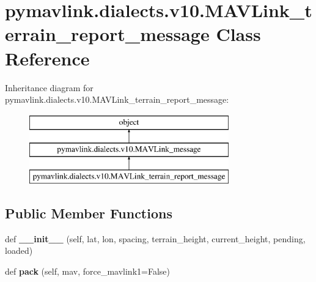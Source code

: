 \hypertarget{classpymavlink_1_1dialects_1_1v10_1_1MAVLink__terrain__report__message}{}\section{pymavlink.\+dialects.\+v10.\+M\+A\+V\+Link\+\_\+terrain\+\_\+report\+\_\+message Class Reference}
\label{classpymavlink_1_1dialects_1_1v10_1_1MAVLink__terrain__report__message}
Inheritance diagram for pymavlink.\+dialects.\+v10.\+M\+A\+V\+Link\+\_\+terrain\+\_\+report\+\_\+message\+:\begin{figure}[H]
\begin{center}
\leavevmode
\includegraphics[height=3.000000cm]{classpymavlink_1_1dialects_1_1v10_1_1MAVLink__terrain__report__message}
\end{center}
\end{figure}
\subsection*{Public Member Functions}
\begin{DoxyCompactItemize}
\item 
\mbox{\label{classpymavlink_1_1dialects_1_1v10_1_1MAVLink__terrain__report__message_acb272283bacb909386cf668215fc85c7}} 
def {\bfseries \+\_\+\+\_\+init\+\_\+\+\_\+} (self, lat, lon, spacing, terrain\+\_\+height, current\+\_\+height, pending, loaded)
\item 
\mbox{\label{classpymavlink_1_1dialects_1_1v10_1_1MAVLink__terrain__report__message_a29d26d3b060cbe2d20de48d902a6d047}} 
def {\bfseries pack} (self, mav, force\+\_\+mavlink1=False)
\end{DoxyCompactItemize}
